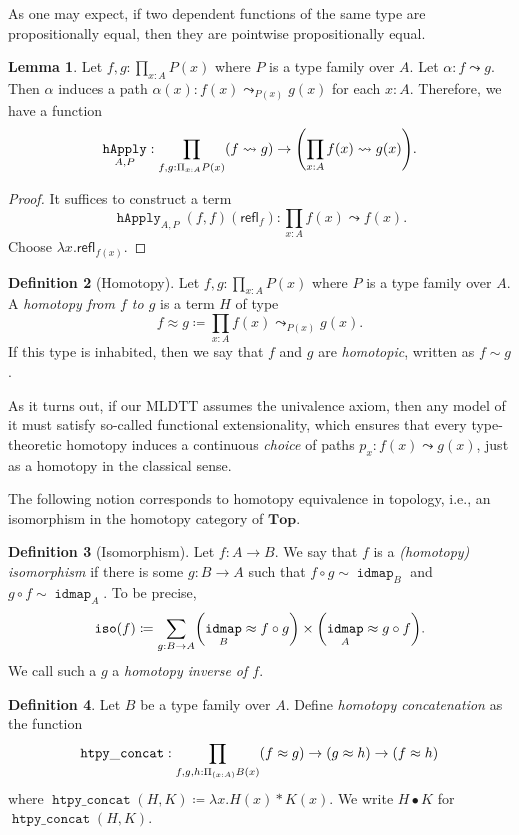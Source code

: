 \documentclass[10pt,letterpaper,cm]{nupset}
\theoremstyle{definition}
\newtheorem{definition}{Definition}[subsection]
\theoremstyle{theorem}
\newtheorem{lemma}[definition]{Lemma}
\theoremstyle{remark}
\newcommand{\refl}{\mathsf{refl}}
\newcommand{\0}{\mathbf{0}}
\newcommand{\1}{\mathbf{1}}
\newcommand{\2}{\mathbf{2}}
\DeclareMathOperator{\idmap}{\mathtt{idmap}}
\DeclareMathOperator{\happly}{\mathtt{hApply}}
\DeclareMathOperator{\iso}{\mathtt{iso}}
\DeclareMathOperator{\hpyconcat}{\mathtt{htpy\_concat}}
\begin{document}
\medskip

As one may expect, if two dependent functions of the same type are propositionally equal, then they are pointwise propositionally equal. 

\begin{lemma}
Let $f,g: \prod_{x:A} P(x)$ where $P$ is a type family over $A$. Let $\alpha : f \leadsto g$. Then $\alpha$ induces a path $\alpha(x) :f(x) \leadsto_{P(x)} g(x)$ for each $x:A$. Therefore, we have a function $$\happly_{A,P} : \prod_{f, g:  \Pi_{x:A} P(x)} \mleft(f\leadsto g\mright) \to \mleft(\prod_{x:A} f(x)\leadsto g(x) \mright).$$
\end{lemma}
\begin{proof}
It suffices to construct a term $$\happly_{A,P}(f, f)(\refl_f) : \prod_{x:A} f(x) \leadsto f(x).$$ Choose $\lambda x. \refl_{f(x)}$.
\end{proof}

\begin{definition}[Homotopy]
Let $f,g: \prod_{x:A} P(x)$ where $P$ is a type family over $A$. A \textit{homotopy from $f$ to $g$} is a term $H$ of type $$f\approx g \coloneqq \prod_{x:A} f(x) \leadsto_{P(x)} g(x)  .$$ If this type is inhabited, then we say that $f$ and $g$ are \textit{homotopic}, written as $f\sim g$.
\end{definition}

As it turns out, if our MLDTT assumes the univalence axiom, then any model of it must satisfy so-called functional extensionality, which ensures that every type-theoretic homotopy induces a continuous \emph{choice} of paths $p_x : f(x) \leadsto g(x)$, just as a  homotopy in  the classical sense.

\medskip

The following notion corresponds to homotopy equivalence in topology, i.e., an isomorphism in the homotopy category of $\mathbf{Top}$.

\begin{definition}[Isomorphism]
Let $f: A \to B$. We say that $f$ is a \textit{(homotopy) isomorphism} if there is some $g:  B \to A$ such that $f \circ g \sim \idmap_B$ and $g\circ f \sim \idmap_A$. To be precise, $$\iso(f) \coloneqq \sum_{g:B \to A} \mleft(\idmap_B \approx f\circ g\mright) \times  \mleft(\idmap_A \approx g\circ f\mright).$$ We call such a $g$ a \textit{homotopy inverse of $f$}.

\end{definition} 

\begin{definition} Let $B$ be a type family over $A$.
 Define \textit{homotopy concatenation} as the function $$\hpyconcat : \prod_{f, g, h : \Pi_{(x : A)} B(x)}\mleft(f \approx g\mright) \rightarrow \mleft(g \approx h\mright) \rightarrow \mleft(f \approx h\mright)$$ where $\hpyconcat(H, K) \coloneqq \lambda x. H(x) \ast K(x)$. We write $H\bullet K$ for $\hpyconcat(H, K)$. 
\end{definition}
\end{document}

